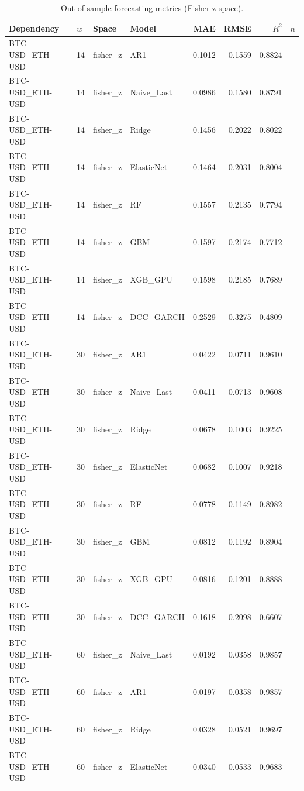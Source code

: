 \begin{table}[H]
\centering
\small
\caption{Out-of-sample forecasting metrics (Fisher-z space).}
\label{tab:model_comparison}
\begin{tabular}{llllrrrr}
\toprule
Dependency & $w$ & Space & Model & MAE & RMSE & $R^2$ & $n$ \\
\midrule
BTC-USD_ETH-USD & 14 & fisher_z & AR1 & 0.1012 & 0.1559 & 0.8824 &  \\
BTC-USD_ETH-USD & 14 & fisher_z & Naive_Last & 0.0986 & 0.1580 & 0.8791 &  \\
BTC-USD_ETH-USD & 14 & fisher_z & Ridge & 0.1456 & 0.2022 & 0.8022 &  \\
BTC-USD_ETH-USD & 14 & fisher_z & ElasticNet & 0.1464 & 0.2031 & 0.8004 &  \\
BTC-USD_ETH-USD & 14 & fisher_z & RF & 0.1557 & 0.2135 & 0.7794 &  \\
BTC-USD_ETH-USD & 14 & fisher_z & GBM & 0.1597 & 0.2174 & 0.7712 &  \\
BTC-USD_ETH-USD & 14 & fisher_z & XGB_GPU & 0.1598 & 0.2185 & 0.7689 &  \\
BTC-USD_ETH-USD & 14 & fisher_z & DCC_GARCH & 0.2529 & 0.3275 & 0.4809 &  \\
BTC-USD_ETH-USD & 30 & fisher_z & AR1 & 0.0422 & 0.0711 & 0.9610 &  \\
BTC-USD_ETH-USD & 30 & fisher_z & Naive_Last & 0.0411 & 0.0713 & 0.9608 &  \\
BTC-USD_ETH-USD & 30 & fisher_z & Ridge & 0.0678 & 0.1003 & 0.9225 &  \\
BTC-USD_ETH-USD & 30 & fisher_z & ElasticNet & 0.0682 & 0.1007 & 0.9218 &  \\
BTC-USD_ETH-USD & 30 & fisher_z & RF & 0.0778 & 0.1149 & 0.8982 &  \\
BTC-USD_ETH-USD & 30 & fisher_z & GBM & 0.0812 & 0.1192 & 0.8904 &  \\
BTC-USD_ETH-USD & 30 & fisher_z & XGB_GPU & 0.0816 & 0.1201 & 0.8888 &  \\
BTC-USD_ETH-USD & 30 & fisher_z & DCC_GARCH & 0.1618 & 0.2098 & 0.6607 &  \\
BTC-USD_ETH-USD & 60 & fisher_z & Naive_Last & 0.0192 & 0.0358 & 0.9857 &  \\
BTC-USD_ETH-USD & 60 & fisher_z & AR1 & 0.0197 & 0.0358 & 0.9857 &  \\
BTC-USD_ETH-USD & 60 & fisher_z & Ridge & 0.0328 & 0.0521 & 0.9697 &  \\
BTC-USD_ETH-USD & 60 & fisher_z & ElasticNet & 0.0340 & 0.0533 & 0.9683 &  \\

\end{tabular}
\end{table}
